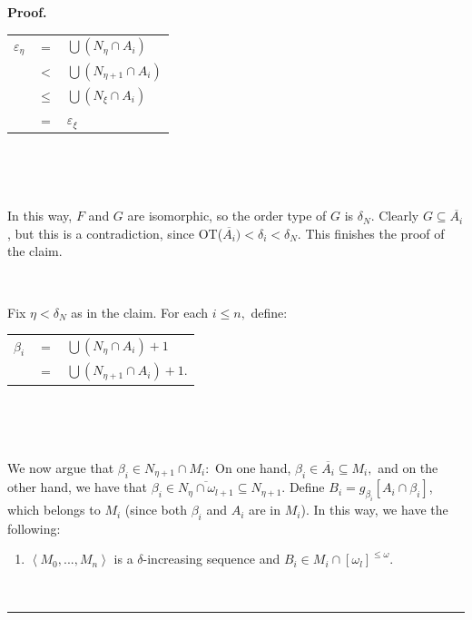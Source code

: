 \documentclass{article}%
\newenvironment{proof}[1][Proof]{\noindent\textbf{#1.} }{\ \rule{0.5em}{0.5em}}
\begin{document}
\begin{proof}
\hfill%
\begin{tabular}
[c]{lll}%
$\varepsilon_{\eta}$ & $=$ & $%
{\displaystyle\bigcup}
\left(  N_{\eta}\cap A_{i}\right)  $\\
& $<$ & $%
{\displaystyle\bigcup}
\left(  N_{\eta+1}\cap A_{i}\right)  $\\
& $\leq$ & $%
{\displaystyle\bigcup}
\left(  N_{\xi}\cap A_{i}\right)  $\\
& $=$ & $\varepsilon_{\xi}$%
\end{tabular}
\qquad\qquad\ \qquad\qquad\qquad\hfill

\qquad\ \ \ \ \qquad\ \ \ \ \ 

In this way, $F$ and $G$ are isomorphic, so the order type of $G$ is
$\delta_{N}.$ Clearly $G\subseteq\overline{A_{i}}$, but this is a
contradiction, since \textsf{OT(}$\overline{A_{i}})<\delta_{i}<\delta_{N}$.
This finishes the proof of the claim.

\qquad\qquad\ \ 

Fix $\eta<\delta_{N}$ as in the claim. For each $i\leq n,$ define:\medskip

\hfill%
\begin{tabular}
[c]{lll}%
$\beta_{i}$ & $=$ & $%
{\displaystyle\bigcup}
\left(  N_{\eta}\cap A_{i}\right)  +1$\\
& $=$ & $%
{\displaystyle\bigcup}
\left(  N_{\eta+1}\cap A_{i}\right)  +1.$%
\end{tabular}
\qquad\qquad\qquad\ \qquad\qquad\hfill

\qquad\ \ \ \ \qquad\ \ \ \ \ 

We now argue that $\beta_{i}\in N_{\eta+1}\cap M_{i}:$ On one hand, $\beta
_{i}\in\overline{A_{i}}\subseteq M_{i},$ and on the other hand, we have that
$\beta_{i}\in\overline{N_{\eta}\cap\omega_{l+1}}\subseteq N_{\eta+1}.$ Define
$B_{i}=g_{\beta_{i}}\left[  A_{i}\cap\beta_{i}\right]  $, which belongs to
$M_{i}$ (since both $\beta_{i}$ and $A_{i}$ are in $M_{i}$). In this way, we
have the following:

\begin{enumerate}
\item $\left\langle M_{0},...,M_{n}\right\rangle $ is a $\delta$-increasing
sequence and $B_{i}\in M_{i}\cap\left[  \omega_{l}\right]  ^{\leq\omega}$.


\end{enumerate}
\end{proof}
\end{document}
